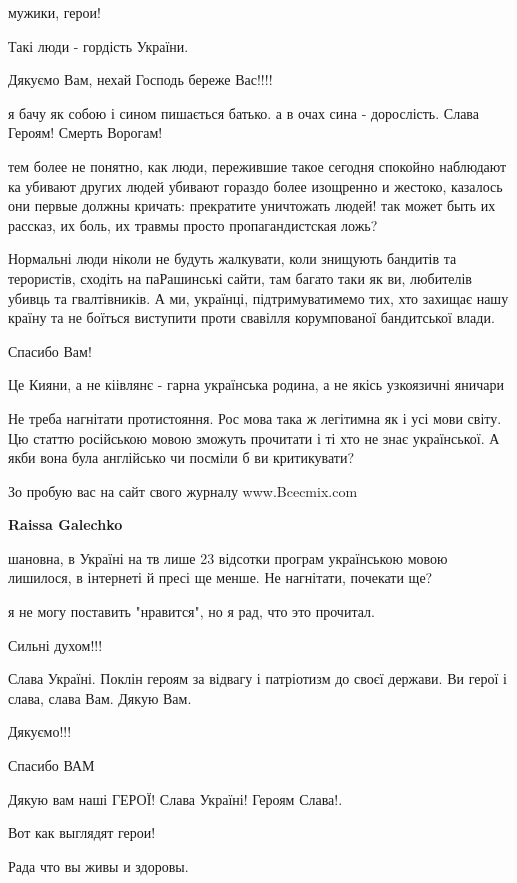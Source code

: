 мужики, герои!

Такі люди - гордість України.

Дякуємо Вам, нехай Господь береже Вас!!!!


я бачу як собою і сином пишається батько. а в очах сина - дорослість. Слава
Героям! Смерть Ворогам!


тем более не понятно, как люди, пережившие такое сегодня спокойно наблюдают ка
убивают других людей убивают гораздо более изощренно и жестоко, казалось они
первые должны кричать: прекратите уничтожать людей! так может быть их
рассказ, их боль, их травмы просто пропагандистская ложь?

\begin{itemize} %

Нормальні люди ніколи не будуть жалкувати, коли знищують бандитів та
терористів, сходіть на паРашинські сайти, там багато таки як ви, любителів
убивць та гвалтівників. А ми, українці, підтримуватимемо тих, хто захищає нашу
країну та не боїться виступити проти свавілля корумпованої бандитської влади.

\end{itemize} %

Спасибо Вам!

Це Кияни, а не кіівлянє - гарна українська родина, а не якісь узкоязичні яничари

\begin{itemize} %

Не треба нагнітати протистояння. Рос мова така ж легітимна як і усі мови світу.
Цю статтю російською мовою зможуть прочитати і ті хто не знає української. А
якби вона була англійсько чи посміли б ви критикувати?

Зо пробую вас на сайт свого журналу www.Bcecmix.com

\textbf{Raissa Galechko} 

шановна, в Україні на тв лише 23 відсотки програм українською мовою лишилося, в
інтернеті й пресі ще менше. Не нагнітати, почекати ще?

\end{itemize} %

я не могу поставить "нравится", но я рад, что это прочитал.


Сильні духом!!!


Слава Україні. Поклін героям за відвагу і патріотизм до своєї держави. Ви герої
і слава, слава Вам. Дякую Вам.

Дякуємо!!!

Спасибо ВАМ

Дякую вам наші ГЕРОЇ!
Слава Україні! Героям Слава!.

Вот как выглядят герои!

Рада что вы живы и здоровы.
